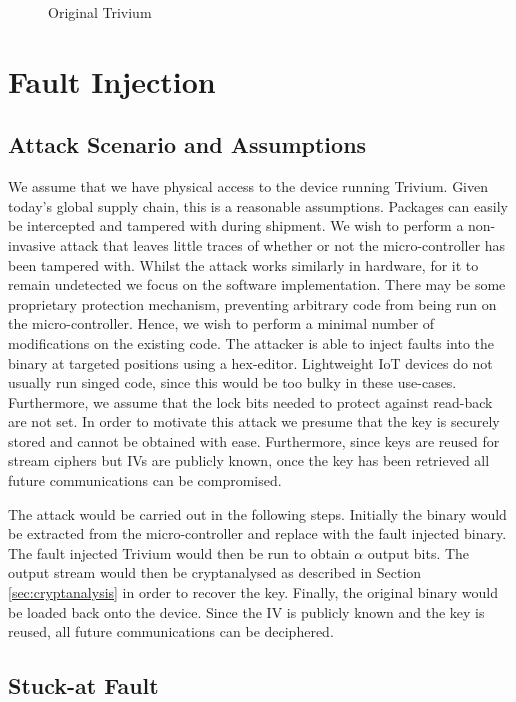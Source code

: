 \documentclass[conference]{IEEEtran}
\begin{document}
\begin{figure}[H]
\centering

\caption{Original Trivium}
\label{fig:original}
\end{figure}

\section{Fault Injection}

\subsection{Attack Scenario and Assumptions}

We assume that we have physical access to the device running Trivium. Given today's global supply chain, this is a reasonable assumptions. Packages can easily be intercepted and tampered with during shipment. We wish to perform a non-invasive attack that leaves little traces of whether or not the micro-controller has been tampered with. Whilst the attack works similarly in hardware, for it to remain undetected we focus on the software implementation. There may be some proprietary protection mechanism, preventing arbitrary code from being run on the micro-controller. Hence, we wish to perform a minimal number of modifications on the existing code. The attacker is able to inject faults into the binary at targeted positions using a hex-editor. Lightweight IoT devices do not usually run singed code, since this would be too bulky in these use-cases. Furthermore, we assume that the lock bits needed to protect against read-back are not set. In order to motivate this attack we presume that the key is securely stored and cannot be obtained with ease. Furthermore, since keys are reused for stream ciphers but IVs are publicly known, once the key has been retrieved all future communications can be compromised. 

The attack would be carried out in the following steps. Initially the binary would be extracted from the micro-controller and replace with the fault injected binary. The fault injected Trivium would then be run to obtain $\alpha$ output bits. The output stream would then be cryptanalysed as described in Section \ref{sec:cryptanalysis} in order to recover the key. Finally, the original binary would be loaded back onto the device. Since the IV is publicly known and the key is reused, all future communications can be deciphered.

\subsection{Stuck-at Fault}
\end{document}
